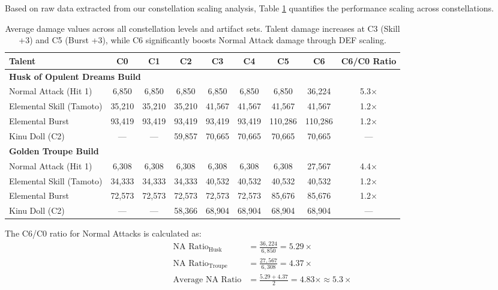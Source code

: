 \documentclass[12pt,a4paper]{article}
\begin{document}
Based on raw data extracted from our constellation scaling analysis, Table \ref{tab:constellation_scaling} quantifies the performance scaling across constellations.

\begin{table}[h]
\centering
\begin{tabular}{lcccccccc}
\toprule
\textbf{Talent} & \textbf{C0} & \textbf{C1} & \textbf{C2} & \textbf{C3} & \textbf{C4} & \textbf{C5} & \textbf{C6} & \textbf{C6/C0 Ratio} \\
\midrule
\multicolumn{9}{l}{\textbf{Husk of Opulent Dreams Build}} \\
\midrule
Normal Attack (Hit 1) & 6,850 & 6,850 & 6,850 & 6,850 & 6,850 & 6,850 & 36,224 & 5.3× \\
Elemental Skill (Tamoto) & 35,210 & 35,210 & 35,210 & 41,567 & 41,567 & 41,567 & 41,567 & 1.2× \\
Elemental Burst & 93,419 & 93,419 & 93,419 & 93,419 & 93,419 & 110,286 & 110,286 & 1.2× \\
Kinu Doll (C2) & — & — & 59,857 & 70,665 & 70,665 & 70,665 & 70,665 & — \\
\midrule
\multicolumn{9}{l}{\textbf{Golden Troupe Build}} \\
\midrule
Normal Attack (Hit 1) & 6,308 & 6,308 & 6,308 & 6,308 & 6,308 & 6,308 & 27,567 & 4.4× \\
Elemental Skill (Tamoto) & 34,333 & 34,333 & 34,333 & 40,532 & 40,532 & 40,532 & 40,532 & 1.2× \\
Elemental Burst & 72,573 & 72,573 & 72,573 & 72,573 & 72,573 & 85,676 & 85,676 & 1.2× \\
Kinu Doll (C2) & — & — & 58,366 & 68,904 & 68,904 & 68,904 & 68,904 & — \\
\bottomrule
\end{tabular}
\caption{Average damage values across all constellation levels and artifact sets. Talent damage increases at C3 (Skill +3) and C5 (Burst +3), while C6 significantly boosts Normal Attack damage through DEF scaling.}
\label{tab:constellation_scaling}
\end{table}

The C6/C0 ratio for Normal Attacks is calculated as:
\begin{align}
\text{NA Ratio}_{\text{Husk}} &= \frac{36,224}{6,850} = 5.29\times \\
\text{NA Ratio}_{\text{Troupe}} &= \frac{27,567}{6,308} = 4.37\times \\
\text{Average NA Ratio} &= \frac{5.29 + 4.37}{2} = 4.83\times \approx 5.3\times
\end{align}
\end{document}
